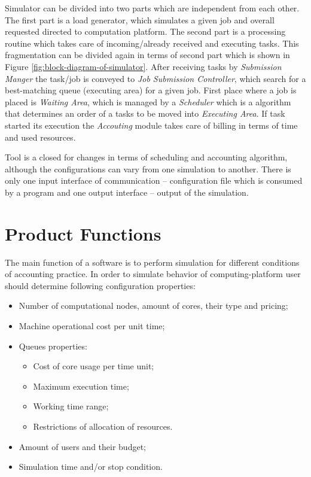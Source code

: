 	Simulator can be divided into two parts which are independent from each other. The first part is a load generator, which simulates a given job and overall requested directed to computation platform. The second part is a processing routine which takes care of incoming/already received and executing tasks. This fragmentation can be divided again in terms of second part which is shown in Figure \ref{fig:block-diagram-of-simulator}. After receiving tasks by \emph{Submission Manger} the task/job is conveyed to \emph{Job Submission Controller}, which search for a best-matching queue (executing area) for a given job. First place where a job is placed is \emph{Waiting Area}, which is managed by a \emph{Scheduler} which is a algorithm that determines an order of a tasks to be moved into \emph{Executing Area}. If task started its execution the \emph{Accouting} module takes care of billing in terms of time and used resources.
		
	Tool is a closed for changes in terms of scheduling and accounting algorithm, although the configurations can vary from one simulation to another. There is only one input interface of communication -- configuration file which is consumed by a program and one output interface -- output of the simulation.
\section{Product Functions}

	The main function of a software is to perform simulation for different conditions of accounting practice. In order to simulate behavior of \gls{computing-platform} user should determine following configuration properties: 
	\begin{itemize}
		\item Number of computational nodes, amount of cores, their type and pricing;
		\item Machine operational cost per unit time;
		\item
		{
			Queues properties:
			\begin{itemize}
				\item Cost of core usage per time unit;
				\item Maximum execution time;
				\item Working time range;
				\item Restrictions of allocation of resources.
			\end{itemize}
		}
		\item
		{
			Amount of users and their budget;
		}
		\item Simulation time and/or stop condition.
	\end{itemize}
	
